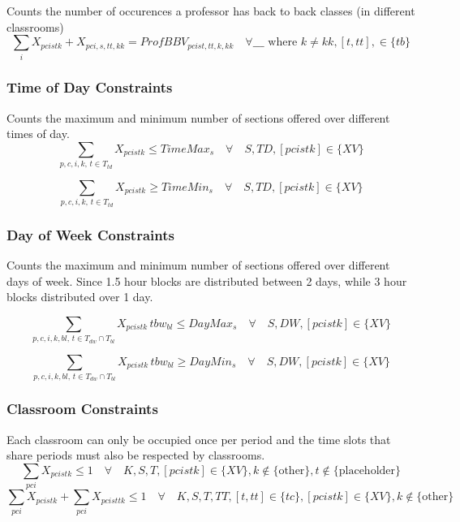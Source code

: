 \documentclass[11pt, oneside]{article}   	%
\begin{document}
Counts the number of occurences a professor has back to back classes (in different classrooms)
\begin{equation}
	\sum_{i} X_{pcistk} + X_{pci,s,tt,kk} = ProfBBV_{pcist,tt,k,kk}  \quad \forall \_ \_ \_ \text{ where }
	k \ne kk, [t, tt], \in \{ tb \}
\end{equation}

\subsubsection{Time of Day Constraints}
Counts the maximum and minimum number of sections offered over different times of day.
\begin{equation}
	\sum_{p,c,i,k,\, t \in T_{td}} X_{pcistk} \le TimeMax_{s} \quad \forall \quad S, TD, [pcistk] \in \{ XV \}
\end{equation}

\begin{equation}
	\sum_{p,c,i,k,\, t \in T_{td}} X_{pcistk} \ge TimeMin_{s} \quad \forall \quad S, TD, [pcistk] \in \{ XV \}
\end{equation}


\subsubsection{Day of Week Constraints}
Counts the maximum and minimum number of sections offered over different days of week. Since 1.5 hour blocks are distributed between 2 days, while 3 hour blocks distributed over 1 day. 

\begin{equation}
	\sum_{p,c,i,k,bl,\, t \in T_{dw} \cap T_{bl}} X_{pcistk} \, tbw_{bl} 
	\le DayMax_{s} \quad \forall \quad S, DW, [pcistk] \in \{ XV \}
\end{equation}

\begin{equation}
	\sum_{p,c,i,k,bl,\, t \in T_{dw} \cap T_{bl}} X_{pcistk} \, tbw_{bl} 
	\ge DayMin_{s} \quad \forall \quad S, DW, [pcistk] \in \{ XV \}
\end{equation}



\subsubsection{Classroom Constraints}
Each classroom can only be occupied once per period and the time slots that share periods must also be respected by classrooms.
\begin{equation}
	\sum_{pci} X_{pcistk} \le 1 \quad \forall \quad K,S,T,
	[pcistk] \in \{ XV \}, k \not \in \{ \text{other} \}, t \not \in \{\text{placeholder} \}
\end{equation}
\begin{equation}
	\sum_{pci} X_{pcistk} + \sum_{pci} X_{pcisttk} \le 1 \quad \forall \quad K,S,T,TT, 
	[t,tt] \in \{tc\}, [pcistk] \in \{ XV \}, k \not \in \{ \text{other} \}
\end{equation}
\end{document}
